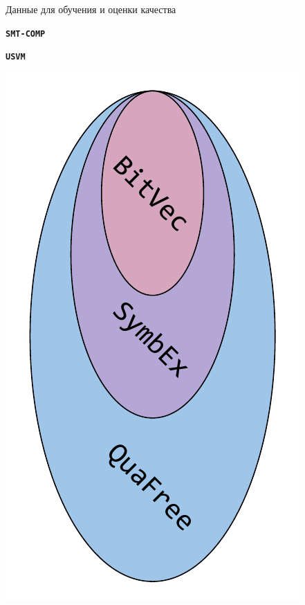 \documentclass[14pt,aspectratio=169,hyperref={pdftex,unicode},xcolor=dvipsnames]{beamer}
\begin{document}
\begin{frame}{Данные для обучения и оценки качества}

\begin{minipage}{0.5\textwidth}

\textbf{\texttt{SMT-COMP}} \cite{smt-comp-2023-benchmarks}

\end{minipage}%
\begin{minipage}{0.5\textwidth}

\textbf{\texttt{USVM}} \cite{usvm-github}

\end{minipage}

\begin{minipage}{0.5\textwidth}

\begin{center}
  \includegraphics[scale=0.45]{./assets/smt-comp-datasets.pdf}
\end{center}


\end{minipage}
\end{frame}
\end{document}
